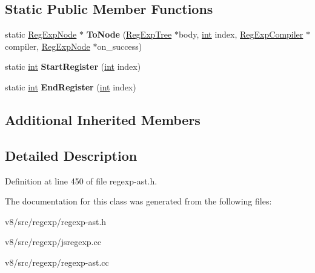 \subsection*{Static Public Member Functions}
\begin{DoxyCompactItemize}
\item 
\mbox{\label{classv8_1_1internal_1_1RegExpCapture_a1d59e925e62a0dd0b69504f08d41ee35}} 
static \mbox{\hyperlink{classv8_1_1internal_1_1RegExpNode}{Reg\+Exp\+Node}} $\ast$ {\bfseries To\+Node} (\mbox{\hyperlink{classv8_1_1internal_1_1RegExpTree}{Reg\+Exp\+Tree}} $\ast$body, \mbox{\hyperlink{classint}{int}} index, \mbox{\hyperlink{classv8_1_1internal_1_1RegExpCompiler}{Reg\+Exp\+Compiler}} $\ast$compiler, \mbox{\hyperlink{classv8_1_1internal_1_1RegExpNode}{Reg\+Exp\+Node}} $\ast$on\+\_\+success)
\item 
\mbox{\label{classv8_1_1internal_1_1RegExpCapture_a0688175225b8ad469d511cc8d0b189f4}} 
static \mbox{\hyperlink{classint}{int}} {\bfseries Start\+Register} (\mbox{\hyperlink{classint}{int}} index)
\item 
\mbox{\label{classv8_1_1internal_1_1RegExpCapture_a254b89ebf6d04d0ba52c0d60a06744ca}} 
static \mbox{\hyperlink{classint}{int}} {\bfseries End\+Register} (\mbox{\hyperlink{classint}{int}} index)
\end{DoxyCompactItemize}
\subsection*{Additional Inherited Members}


\subsection{Detailed Description}


Definition at line 450 of file regexp-\/ast.\+h.



The documentation for this class was generated from the following files\+:\begin{DoxyCompactItemize}
\item 
v8/src/regexp/regexp-\/ast.\+h\item 
v8/src/regexp/jsregexp.\+cc\item 
v8/src/regexp/regexp-\/ast.\+cc\end{DoxyCompactItemize}
